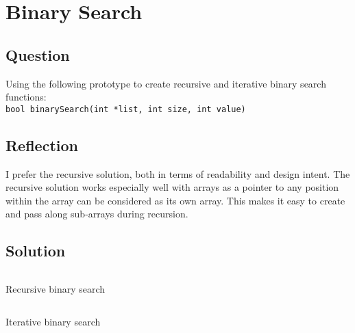 \section{Binary Search}
    \subsection*{Question}
        Using the following prototype to create recursive and iterative binary search functions:\\
        \texttt{bool binarySearch(int *list, int size, int value)}

    \subsection*{Reflection}
        I prefer the recursive solution, both in terms of readability and design intent.
        The recursive solution works especially well with arrays as a pointer to any position
        within the array can be considered as its own array. This makes it easy to create and pass along sub-arrays during recursion.

    \subsection*{Solution}
        \begin{listing}[H]
            \inputminted[firstline=33, lastline=62]{cpp}{../Tasks/03-BinarySearch/Main.cpp}
            \caption{Recursive binary search}
        \end{listing}

        \begin{listing}[H]
            \inputminted[firstline=64, lastline=93]{cpp}{../Tasks/03-BinarySearch/Main.cpp}
            \caption{Iterative binary search}
        \end{listing}